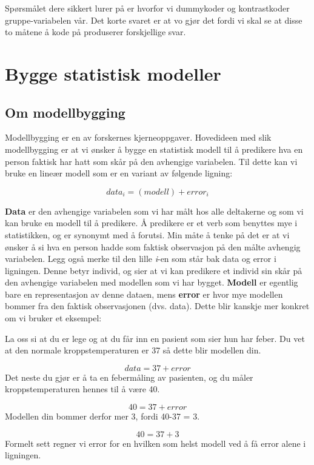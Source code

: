 \documentclass[
]{book}
\begin{document}
Spørsmålet dere sikkert lurer på er hvorfor vi dummykoder og kontrastkoder gruppe-variabelen vår. Det korte svaret er at vo gjør det fordi vi skal se at disse to måtene å kode på produserer forskjellige svar.

\hypertarget{bygge-statistisk-modeller}{%
\chapter{Bygge statistisk modeller}\label{bygge-statistisk-modeller}}

\hypertarget{om-modellbygging}{%
\section{Om modellbygging}\label{om-modellbygging}}

Modellbygging er en av forskernes kjerneoppgaver. Hovedideen med slik modellbygging er at vi ønsker å bygge en statistisk modell til å predikere hva en person faktisk har hatt som skår på den avhengige variabelen. Til dette kan vi bruke en lineær modell som er en variant av følgende ligning:

\[
data_i = (modell) + error_i
\]

\textbf{Data} er den avhengige variabelen som vi har målt hos alle deltakerne og som vi kan bruke en modell til å predikere. Å predikere er et verb som benyttes mye i statistikken, og er synonymt med å forutsi. Min måte å tenke på det er at vi ønsker å si hva en person hadde som faktisk observasjon på den målte avhengig variabelen. Legg også merke til den lille \emph{i}-en som står bak data og error i ligningen. Denne betyr individ, og sier at vi kan predikere et individ sin skår på den avhengige variabelen med modellen som vi har bygget. \textbf{Modell} er egentlig bare en representasjon av denne dataen, mens \textbf{error} er hvor mye modellen bommer fra den faktisk observasjonen (dvs. data). Dette blir kanskje mer konkret om vi bruker et eksempel:

La oss si at du er lege og at du får inn en pasient som sier hun har feber. Du vet at den normale kroppstemperaturen er 37 så dette blir modellen din.

\[
data = 37 + error
\]
Det neste du gjør er å ta en febermåling av pasienten, og du måler kroppstemperaturen hennes til å være 40.

\[
40 = 37 + error
\]
Modellen din bommer derfor mer 3, fordi 40-37 = 3.

\[
40 = 37 + 3
\]
Formelt sett regner vi error for en hvilken som helst modell ved å få error alene i ligningen.
\end{document}
